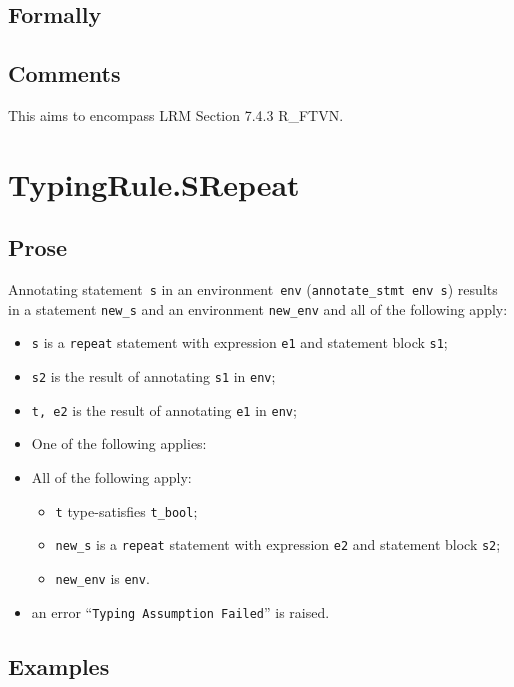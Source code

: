 \documentclass{book}
\begin{document}
  \subsection{Formally}

  \subsection{Comments}
    This aims to encompass LRM Section 7.4.3 R\_FTVN.

\section{TypingRule.SRepeat \label{sec:TypingRule.SRepeat}}

  \subsection{Prose}
Annotating statement~\texttt{s} in an environment~\texttt{env}
(\texttt{annotate\_stmt env s}) results in a statement \texttt{new\_s} and an
environment \texttt{new\_env} and all of the following apply:
   \begin{itemize}
   \item \texttt{s} is a \texttt{repeat} statement with expression \texttt{e1} and statement block \texttt{s1};
   \item \texttt{s2} is the result of annotating \texttt{s1} in \texttt{env};
   \item \texttt{t, e2} is the result of annotating \texttt{e1} in \texttt{env};
   \item One of the following applies:
     \item All of the following apply:
       \begin{itemize}
       \item \texttt{t} type-satisfies \texttt{t\_bool}; 
       \item \texttt{new\_s} is a \texttt{repeat} statement with expression \texttt{e2} and statement block \texttt{s2};
       \item \texttt{new\_env} is \texttt{env}.
       \end{itemize}
     \item an error ``\texttt{Typing Assumption Failed}'' is raised.
   \end{itemize}

  \subsection{Examples}
\end{document}

